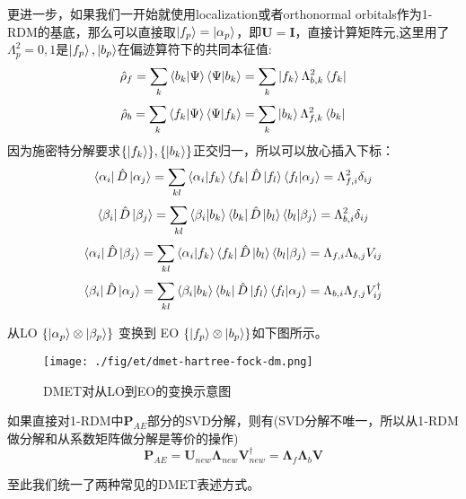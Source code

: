 更进一步，如果我们一开始就使用localization或者orthonormal orbitals作为1-RDM的基底，那么可以直接取$\ket{f_p}=\ket{\alpha_p}$，即$\mathbf{U}=\mathbf{I}$，直接计算矩阵元,这里用了$\Lambda_p^2=0,1$是$\ket{f_p},\ket{b_p}$在偏迹算符下的共同本征值:
\[\hat{\rho}_f=\sum_k\bra{b_k}\ket{\Psi}\bra{\Psi}\ket{b_k}=\sum_k\ket{f_k}\Lambda_{b,k}^2\bra{f_k}\]
\[\hat{\rho}_b=\sum_k\bra{f_k}\ket{\Psi}\bra{\Psi}\ket{f_k}=\sum_k\ket{b_k}\Lambda_{f,k}^2\bra{b_k}\]
因为施密特分解要求$\{\ket{f_k}\},\{\ket{b_k}\}$正交归一，所以可以放心插入下标：
\[\bra{\alpha_i}\hat{D}\ket{\alpha_j} = \sum_{kl}\bra{\alpha_i}\ket{f_k}\bra{f_k}\hat{D}\ket{f_l}\bra{f_l}\ket{\alpha_j} =\Lambda_{f,i}^2\delta_{ij}\]
\[\bra{\beta_i}\hat{D}\ket{\beta_j} = \sum_{kl}\bra{\beta_i}\ket{b_k}\bra{b_k}\hat{D}\ket{b_l}\bra{b_l}\ket{\beta_j} =\Lambda_{b,i}^2\delta_{ij}\]
\[\bra{\alpha_i}\hat{D}\ket{\beta_j} = \sum_{kl}\bra{\alpha_i}\ket{f_k}\bra{f_k}\hat{D}\ket{b_l}\bra{b_l}\ket{\beta_j} =\Lambda_{f,i}\Lambda_{b,j}V_{ij}\]
\[\bra{\beta_i}\hat{D}\ket{\alpha_j} = \sum_{kl}\bra{\beta_i}\ket{b_k}\bra{b_k}\hat{D}\ket{f_l}\bra{f_l}\ket{\alpha_j} =\Lambda_{b,i}\Lambda_{f,j}V^{\dagger}_{ij}\]

从LO $\{\ket{\alpha_p}\otimes\ket{\beta_p}\}$ 变换到 EO $\{\ket{f_p}\otimes\ket{b_p}\}$如下图所示。
\begin{figure}[htbp]
    \centering
    \texttt{[image: ./fig/et/dmet-hartree-fock-dm.png]}
    \caption{DMET对从LO到EO的变换示意图}
\end{figure}

如果直接对1-RDM中$\mathbf{P}_{AE}$部分的SVD分解，则有(SVD分解不唯一，所以从1-RDM做分解和从系数矩阵做分解是等价的操作)
\[\mathbf{P}_{AE}=\mathbf{U}_{new}\mathbf{\Lambda}_{new}\mathbf{V}_{new}^{\dagger}=\mathbf{\Lambda}_f\mathbf{\Lambda}_b \mathbf{V}\]

至此我们统一了两种常见的DMET表述方式。